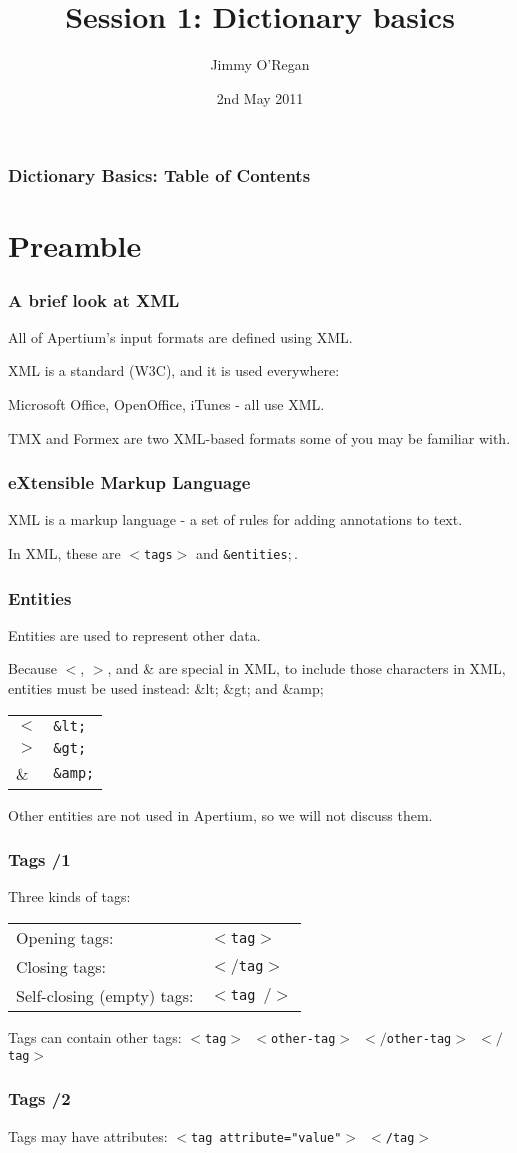 \documentclass{beamer} %
\date{2nd May 2011}
\title{Session 1: Dictionary basics}
\author{Jimmy O'Regan}
\newcommand{\MyLogoBottomCentred}{
\begin{textblock}{14}(53.5,70)
  \pgfuseimage{logo}
\end{textblock}
}
\begin{document}
\frame{\titlepage \MyLogoBottomCentred}


\begin{frame}
  \frametitle{Dictionary Basics: Table of Contents}
  \tableofcontents
\end{frame}


\section{Preamble}

\begin{frame}
  \frametitle{A brief look at XML}
  All of Apertium's input formats are defined using XML.

  XML is a standard (W3C), and it is used everywhere:

  Microsoft Office, OpenOffice, iTunes - all use XML.

  TMX and Formex are two XML-based formats some of you may be familiar with.
\end{frame}

\begin{frame}
  \frametitle{eXtensible Markup Language}

  XML is a markup language - a set of rules for adding annotations to text.

  In XML, these are {\tt $<$tags$>$} and {\tt \&entities$;$}.

\end{frame}

\begin{frame}
  \frametitle{Entities}

  Entities are used to represent other data.

  Because $<$, $>$, and \& are special in XML, to include those characters in XML, entities must be used instead: \&lt; \&gt; and \&amp;

    \begin{tabular}{ll}
      $<$ & {\tt \&lt;} \\
      $>$ & {\tt \&gt;} \\
      \& & {\tt \&amp;}
    \end{tabular}

  Other entities are not used in Apertium, so we will not discuss them.

\end{frame}

\begin{frame}
  \frametitle{Tags /1}

  \begin{exampleblock}{Three kinds of tags:}
    \begin{tabular}{ll}
      Opening tags: & {\tt $<$tag$>$} \\
      Closing tags: & {\tt $</$tag$>$} \\
      Self-closing (empty) tags: & {\tt $<$tag $/>$}
    \end{tabular}
  \end{exampleblock}


  Tags can contain other tags: {\tt $<$tag$>$ $<$other-tag$>$ $</$other-tag$>$ $</$tag$>$}
\end{frame}

\begin{frame}
  \frametitle{Tags /2}

  Tags may have attributes: {\tt $<$tag attribute="value"$>$ $<$/tag$>$}

\end{frame}
\end{document}
